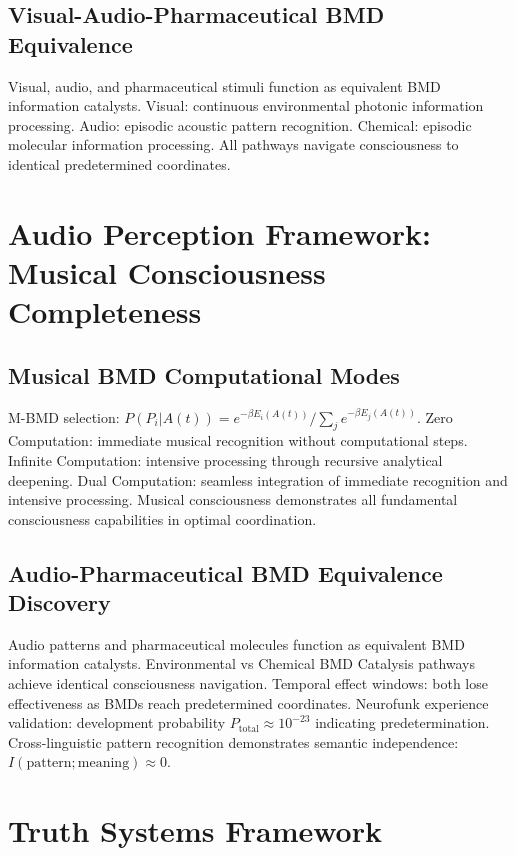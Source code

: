 \documentclass[12pt,a4paper]{article}
\begin{document}
\subsection{Visual-Audio-Pharmaceutical BMD Equivalence}

Visual, audio, and pharmaceutical stimuli function as equivalent BMD information catalysts. Visual: continuous environmental photonic information processing. Audio: episodic acoustic pattern recognition. Chemical: episodic molecular information processing. All pathways navigate consciousness to identical predetermined coordinates.

\section{Audio Perception Framework: Musical Consciousness Completeness}

\subsection{Musical BMD Computational Modes}

M-BMD selection: $P(P_i | A(t)) = e^{-\beta E_i(A(t))} / \sum_j e^{-\beta E_j(A(t))}$. Zero Computation: immediate musical recognition without computational steps. Infinite Computation: intensive processing through recursive analytical deepening. Dual Computation: seamless integration of immediate recognition and intensive processing. Musical consciousness demonstrates all fundamental consciousness capabilities in optimal coordination.

\subsection{Audio-Pharmaceutical BMD Equivalence Discovery}

Audio patterns and pharmaceutical molecules function as equivalent BMD information catalysts. Environmental vs Chemical BMD Catalysis pathways achieve identical consciousness navigation. Temporal effect windows: both lose effectiveness as BMDs reach predetermined coordinates. Neurofunk experience validation: development probability $P_{\text{total}} \approx 10^{-23}$ indicating predetermination. Cross-linguistic pattern recognition demonstrates semantic independence: $I(\text{pattern}; \text{meaning}) \approx 0$.

\section{Truth Systems Framework}
\end{document}
